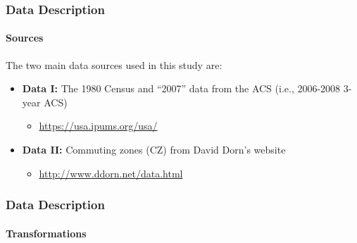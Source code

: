 
\begin{frame}
    \frametitle{Data Description}
    \framesubtitle{Sources}
    The two main data sources used in this study are:
    \begin{itemize}
        \item \textbf{Data I:} The 1980 Census and “2007” data from the ACS (i.e., 2006-2008 3-year ACS)
        \begin{itemize}
            \item \url{https://usa.ipums.org/usa/}
        \end{itemize}
        \item \textbf{Data II:} Commuting zones (CZ) from David Dorn's website
        \begin{itemize}
            \item \url{http://www.ddorn.net/data.html}
        \end{itemize}
    \end{itemize}
\end{frame}

\begin{frame}
    \frametitle{Data Description}
    \framesubtitle{Transformations}
\end{frame}



